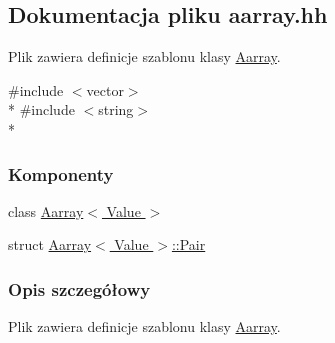 \hypertarget{aarray_8hh}{\subsection{Dokumentacja pliku aarray.\-hh}
\label{aarray_8hh}
}


Plik zawiera definicje szablonu klasy \hyperlink{class_aarray}{Aarray}.  


{\ttfamily \#include $<$vector$>$}\\*
{\ttfamily \#include $<$string$>$}\\*
\subsubsection*{Komponenty}
\begin{DoxyCompactItemize}
\item 
class \hyperlink{class_aarray}{Aarray$<$ Value $>$}
\item 
struct \hyperlink{struct_aarray_1_1_pair}{Aarray$<$ Value $>$\-::\-Pair}
\end{DoxyCompactItemize}


\subsubsection{Opis szczegółowy}
Plik zawiera definicje szablonu klasy \hyperlink{class_aarray}{Aarray}. 